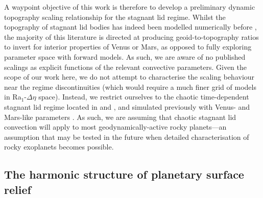 \documentclass[trackchanges]{aastex63}
\begin{document}
A waypoint objective of this work is therefore to develop a preliminary dynamic topography scaling relationship for the stagnant lid regime. Whilst the topography of  stagnant lid bodies has indeed been modelled numerically before \citep{moresi_interpreting_1995, solomatov_stagnant_1996, vezolainen_timing_2003, vezolainen_uplift_2004, orth_isostatic_2011, golle_topography_2012, huang_constraints_2013}, the majority of this literature is directed at producing geoid-to-topography ratios to invert for interior properties of Venus or Mars, as opposed to fully exploring parameter space with forward models. As such, we are aware of no published scalings as explicit functions of the relevant convective parameters. Given the scope of our work here, we do not attempt to characterise the scaling behaviour near the regime discontinuities (which would require a much finer grid of models in Ra$_1$-$\Delta \eta$ space). Instead, we restrict ourselves to the chaotic time-dependent stagnant lid regime located in \citet{moresi_numerical_1995} and \citet{orth_isostatic_2011}, and simulated previously with Venus- and Mars-like parameters \citep{solomatov_scaling_2000, hauck_thermal_2002, reese_scaling_2005, orth_isostatic_2011}. As such, we are assuming that chaotic stagnant lid convection will apply to most geodynamically-active rocky planets---an assumption that may be tested in the future when detailed characterisation of rocky exoplanets becomes possible.




  

\subsection{The harmonic structure of planetary surface relief} \label{sec:intro-spectrum}
\end{document}
